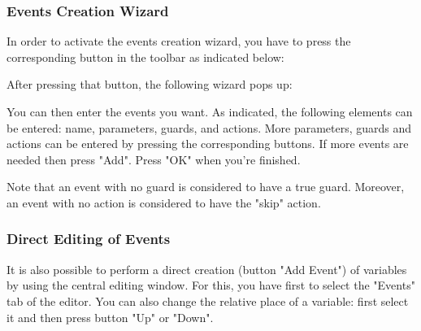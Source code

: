 \subsubsection{Events Creation Wizard}

In order to activate the events creation wizard, you have to press the corresponding button in the toolbar as indicated below:


After pressing that button, the following wizard pops up: 


You can then enter the events you want. As indicated, the following elements can be entered: name, parameters, guards, and actions. More parameters, guards and actions can be entered by pressing the corresponding buttons. If more events are needed then press "Add". Press "OK" when you’re finished.

Note that an event with no guard is considered to have a true guard. Moreover, an event with no action is considered to have the "skip" action. 

\subsubsection{Direct Editing of Events}

It is also possible to perform a direct creation (button "Add Event") of variables by using the central editing window. For this, you have first to select the "Events" tab of the editor. You can also change the relative place of a variable: first select it and then press button "Up" or "Down".


